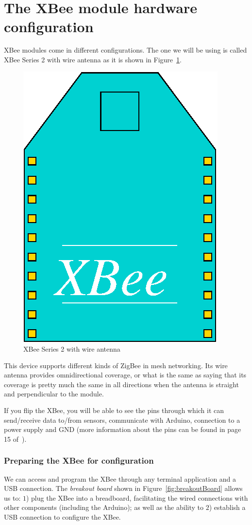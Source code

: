 \section{The XBee module hardware configuration}\label{xbee:hardware}

XBee modules come in different configurations. The one we will be using is called XBee Series 2 with wire antenna as it is shown in Figure~\ref{fig:xbee}.

\begin{figure}[htbp]
  \centering
  \includegraphics[width=0.4\linewidth]{figures/xbee.eps}
  \caption{XBee Series 2 with wire antenna
  \label{fig:xbee}}
\end{figure}

This device supports different kinds of ZigBee in mesh networking. Its wire antenna provides omnidirectional coverage, or what is the same as saying that its coverage is pretty much the same in all directions when the antenna is straight and perpendicular to the module.

If you flip the XBee, you will be able to see the pins through which it can send/receive data to/from sensors, communicate with Arduino, connection to a power supply and GND (more information about the pins can be found in page 15 of~\cite{faludi2010bws}).

\subsubsection{Preparing the XBee for configuration}

We can access and program the XBee through any terminal application and a USB connection. The \emph{breakout board} shown in Figure~\ref{fig:breakoutBoard} allows us to: $1$) plug the XBee into a breadboard, facilitating the wired connections with other components (including the Arduino); as well as the ability to $2$) establish a USB connection to configure the XBee.

